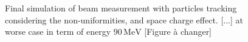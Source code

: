 \begin{figure}[!ht]
	\begin{center}
		
	\end{center}
	\caption[]{Final simulation of beam measurement with particles tracking considering the non-uniformities, and space charge effect. [...] at worse case in term of energy $90\,\mathrm{MeV}$ [Figure à changer]}
	\label{chap3:fig:}
\end{figure}
